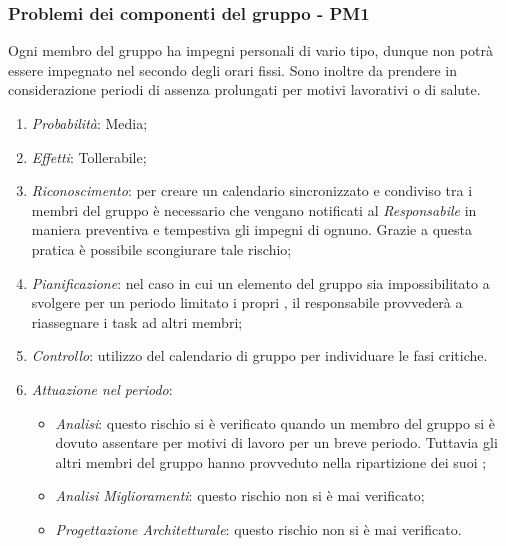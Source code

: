 \subsubsection{Problemi dei componenti del gruppo - PM1}
Ogni membro del gruppo ha impegni personali di vario tipo, dunque non potr\`a essere impegnato nel  secondo degli orari fissi. Sono inoltre da prendere in considerazione periodi di assenza prolungati per motivi lavorativi o di salute.
\begin{enumerate}
\item \textit{Probabilit\`a}: Media;
\item \textit{Effetti}: Tollerabile;
\item \textit{Riconoscimento}: per creare un calendario sincronizzato e condiviso tra i membri del gruppo è necessario che vengano notificati al \textit{Responsabile} in maniera preventiva e tempestiva gli impegni di ognuno. Grazie a questa pratica è possibile scongiurare tale rischio;
\item \textit{Pianificazione}: nel caso in cui un elemento del gruppo sia impossibilitato a svolgere per un periodo limitato i propri , il responsabile provveder\`a a riassegnare i task ad altri membri;
\item \textit{Controllo}: utilizzo del calendario di gruppo per individuare le fasi critiche.
\item \textit{Attuazione nel periodo}: 
	\begin{itemize}
	\item \textit{Analisi}: questo rischio si è verificato quando un membro del gruppo si è dovuto assentare per motivi di lavoro per un breve periodo. Tuttavia gli altri membri del gruppo hanno provveduto nella ripartizione dei suoi ;
	\item \textit{Analisi Miglioramenti}: questo rischio non si è mai verificato;
	\item \textit{Progettazione Architetturale}: questo rischio non si è mai verificato.
	\end{itemize}
\end{enumerate}

